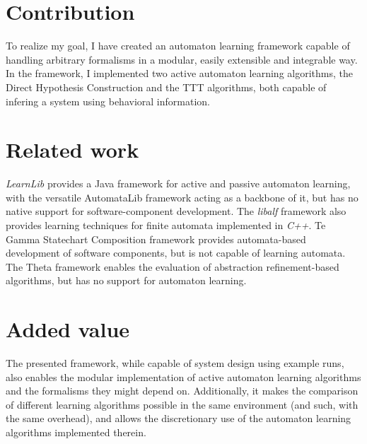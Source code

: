 \section{Contribution}

To realize my goal, I have created an automaton learning framework capable of handling arbitrary formalisms in a modular, easily extensible and integrable way. In the framework, I implemented two active automaton learning algorithms, the Direct Hypothesis Construction\cite{10.1007/978-3-642-34781-8_19} and the TTT\cite{10.1007/978-3-319-11164-3_26} algorithms, both capable of infering a system using behavioral information.

\section{Related work}



\emph{LearnLib}\cite{10.1007/978-3-319-21690-4_32} provides a Java framework for active and passive automaton learning, with the versatile AutomataLib framework acting as a backbone of it, but has no native support for software-component development. The \emph{libalf} framework also provides learning techniques for finite automata implemented in \emph{C++}. Te Gamma Statechart Composition framework\cite{DBLP:conf/icse/MolnarGVMV18} provides automata-based development of software components, but is not capable of learning automata. The Theta framework\cite{theta-fmcad2017} enables the evaluation of abstraction refinement-based algorithms, but has no support for automaton learning.

\section{Added value}

The presented framework, while capable of system design using example runs, also enables the modular implementation of active automaton learning algorithms and the formalisms they might depend on. Additionally, it makes the comparison of different learning algorithms possible in the same environment (and such, with the same overhead), and allows the discretionary use of the automaton learning algorithms implemented therein.
